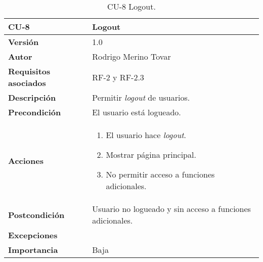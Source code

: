 \begin{table}[p]
	\centering
	\begin{tabularx}{\linewidth}{ p{} p{} }
		\toprule
		\textbf{CU-8}    & \textbf{Logout}\\
		\toprule
		\textbf{Versión}              & 1.0    \\
		\textbf{Autor}                & Rodrigo Merino Tovar \\
		\textbf{Requisitos asociados} & RF-2 y RF-2.3 \\
		\textbf{Descripción}          & Permitir \emph{logout} de usuarios.\\
		\textbf{Precondición}         & El usuario está logueado. \\
		\textbf{Acciones}             &
		\begin{enumerate}
			\def\labelenumi{\arabic{enumi}.}
			\tightlist
			\item El usuario hace \emph{logout}. 
			\item Mostrar página principal. 
			\item No permitir acceso a funciones adicionales.
		\end{enumerate}\\
		\textbf{Postcondición}        & Usuario no logueado y sin acceso a funciones adicionales. \\
		\textbf{Excepciones}          & \\
		\textbf{Importancia}          & Baja \\
		\bottomrule
	\end{tabularx}
	\caption{CU-8 Logout.}
\end{table}


